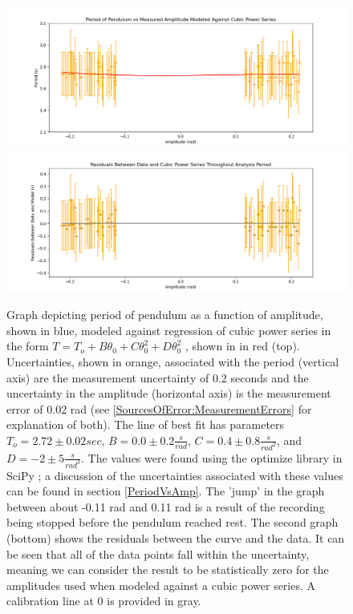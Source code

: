 \documentclass[11pt]{article}
\begin{document}
        \begin{figure}[H]
            \centering\includegraphics[width = \textwidth]{CubicPowerSeriesData.png}
            \centering\includegraphics[width = \textwidth]{CubicPowerSeriesResiduals.png}
            \caption{Graph depicting period of pendulum as a function of amplitude, shown in blue, modeled against regression of cubic power series in the form $T = T_{o} + B\theta_{0} + C\theta_{0}^{2} + D\theta_{0}^2$ \cite{labManual}, shown in in red (top). Uncertainties, shown in orange, associated with the period (vertical axis) are the measurement uncertainty of 0.2 seconds and the uncertainty in the amplitude (horizontal axis) is the measurement error of 0.02 rad (see \ref{SourcesOfError:MeasurementErrors} for explanation of both). The line of best fit has parameters  $T_o = 2.72 \pm 0.02 sec$, $B = 0.0 \pm 0.2 \frac{s}{rad}$,  $C = 0.4 \pm 0.8 \frac{s}{rad^2}$, and $D = -2 \pm 5 \frac{s}{rad^3}$. The values were found using the optimize library in SciPy \cite{2020SciPy-NMeth}; a discussion of the uncertainties associated with these values can be found in section \ref{PeriodVsAmp}. The 'jump' in the graph between about -0.11 rad and 0.11 rad is a result of the recording being stopped before the pendulum reached rest. The second graph (bottom) shows the residuals between the curve and the data. It can be seen that all of the data points fall within the uncertainty, meaning we can consider the result to be statistically zero for the amplitudes used when modeled against a cubic power series. A calibration line at 0 is provided in gray.}
            \label{fig:CubicPowerSeries}        
        \end{figure}
\end{document}
